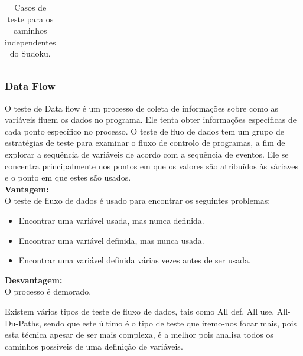 \documentclass{article}
\begin{document}
\begin{itemize}
\begin{enumerate}
\begin{table}[H]
\begin{tabular}{|c|p{7cm}|p{3cm}|}
    \end{tabular}
    \caption{Casos de teste para os caminhos independentes do Sudoku.}
    \label{tab:tabela_exemplo}
\end{table}

\end{enumerate}

\end{itemize}
\subsubsection{Data Flow}

\texttt{}\par O teste de Data flow é um processo de coleta de informações sobre como as variáveis fluem os dados no programa. Ele tenta obter informações específicas de cada ponto específico no processo. O teste de fluo de dados tem um grupo de estratégias de teste para examinar o fluxo de controlo de programas, a fim de explorar a sequência de variáveis de acordo com a sequência de eventos. Ele se concentra principalmente nos pontos em que os valores são atribuídos às váriaves e o ponto em que estes são usados.\\

\textbf{Vantagem:}\\
O teste de fluxo de dados é usado para encontrar os seguintes problemas:\\
\begin{itemize}
    \item Encontrar uma variável usada, mas nunca definida.
    \item Encontrar uma variável definida, mas nunca usada.
    \item Encontrar uma variável definida várias vezes antes de ser usada.
\end{itemize}

\textbf{Desvantagem:}\\
O processo é demorado.\\


\texttt{}\par Existem vários tipos de teste de fluxo de dados, tais como All def, All use, All-Du-Paths, sendo que este último é o tipo de teste que iremo-nos focar mais, pois esta técnica apesar de ser mais complexa, é a melhor pois analisa todos os caminhos possíveis de uma definição de variáveis.
\end{document}

